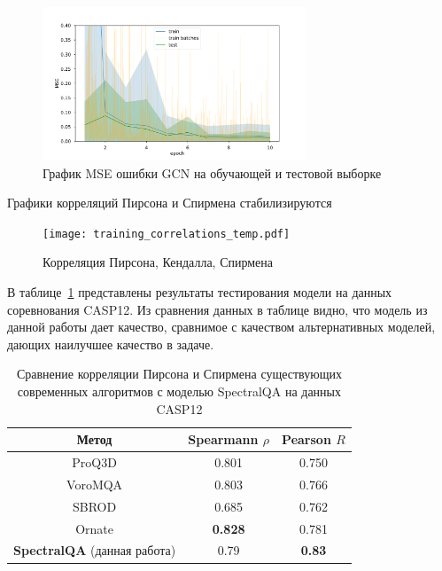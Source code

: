 \documentclass[14pt]{extarticle}
\begin{document}
\begin{figure}[H]
		\centering
		\includegraphics[width=0.7\textwidth]{training.pdf}
		\caption{График MSE ошибки GCN на обучающей и тестовой выборке}
		\label{fig:GCN}
	\end{figure}
Графики корреляций Пирсона и Спирмена стабилизируются
\begin{figure}[H]
		\centering
		\texttt{[image: training\_correlations\_temp.pdf]}
		\caption{Корреляция Пирсона, Кендалла, Спирмена}
		\label{fig:correlation}
\end{figure}

В таблице~\ref{Tab:results} представлены результаты тестирования модели на данных соревнования CASP12. Из сравнения данных в таблице видно, что модель из данной работы дает качество, сравнимое с качеством альтернативных моделей, дающих наилучшее качество в задаче.
\begin{center}
	\begin{table}[h]
		\centering
		\begin{tabular}{ccc}
			\hline Метод & Spearmann $\rho$ &  Pearson $R$ \\
			\hline ProQ3D & 0.801 & 0.750 \\
			VoroMQA & 0.803 & 0.766  \\
			SBROD & 0.685 & 0.762  \\
			Ornate & \textbf{0.828} & 0.781   \\
			\textbf{SpectralQA} (данная работа) &   {0.79}&   \textbf{0.83}   \\
			\hline 
		\end{tabular}
		\caption{Сравнение корреляции Пирсона и Спирмена существующих современных алгоритмов с моделью SpectralQA на данных CASP12}
		\label{Tab:results}
	\end{table}
\end{center}

\end{document}
